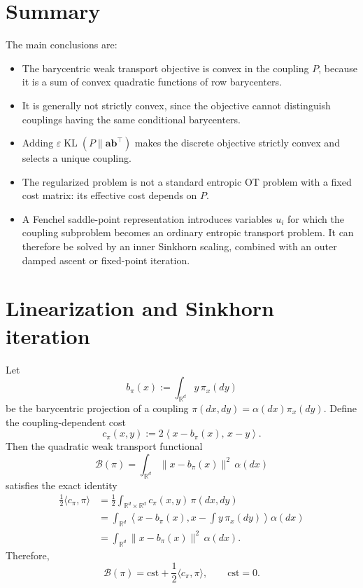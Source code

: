 \documentclass[11pt]{article}
\newcommand{\KL}{\operatorname{KL}}
\begin{document}
\section{Summary}

The main conclusions are:
\begin{itemize}
    \item The barycentric weak transport objective is convex in the coupling
    $P$, because it is a sum of convex quadratic functions of row
    barycenters.
    \item It is generally not strictly convex, since the objective cannot
    distinguish couplings having the same conditional barycenters.
    \item Adding $\varepsilon\KL(P\|\bm{a}\bm{b}^{\top})$ makes the discrete
    objective strictly convex and selects a unique coupling.
    \item The regularized problem is not a standard entropic OT problem with
    a fixed cost matrix: its effective cost depends on $P$.
    \item A Fenchel saddle-point representation introduces variables $u_i$
    for which the coupling subproblem becomes an ordinary entropic transport
    problem. It can therefore be solved by an inner Sinkhorn scaling,
    combined with an outer damped ascent or fixed-point iteration.
\end{itemize}

\section{Linearization and Sinkhorn iteration}

Let
\[
    b_\pi(x):=\int_{\mathbb{R}^d}y\,\pi_x(dy)
\]
be the barycentric projection of a coupling
\(\pi(dx,dy)=\alpha(dx)\pi_x(dy)\). Define the coupling-dependent cost
\[
    \boxed{
    c_\pi(x,y)
    :=
    2\left\langle x-b_\pi(x),\,x-y\right\rangle.
    }
\]
Then the quadratic weak transport functional
\[
    \mathcal B(\pi)
    =
    \int_{\mathbb{R}^d}
    \|x-b_\pi(x)\|^2\,\alpha(dx)
\]
satisfies the exact identity
\begin{align*}
    \frac12\langle c_\pi,\pi\rangle
    &=
    \frac12
    \int_{\mathbb{R}^d\times\mathbb{R}^d}
    c_\pi(x,y)\,\pi(dx,dy)\\
    &=
    \int_{\mathbb{R}^d}
    \left\langle
        x-b_\pi(x),
        x-\int y\,\pi_x(dy)
    \right\rangle
    \alpha(dx)\\
    &=
    \int_{\mathbb{R}^d}
    \|x-b_\pi(x)\|^2\,\alpha(dx).
\end{align*}
Therefore,
\[
    \boxed{
    \mathcal B(\pi)
    =
    \mathrm{cst}
    +
    \frac12\langle c_\pi,\pi\rangle,
    \qquad
    \mathrm{cst}=0.
    }
\]
\end{document}

